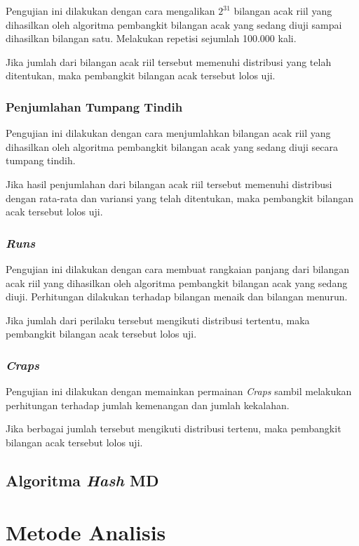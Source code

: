 \documentclass[conference]{IEEEtran}
\newcommand{\en}[1]
    {\foreignlanguage{english}{\textit{#1}}}
\begin{document}
Pengujian ini dilakukan dengan cara mengalikan $2^31$ bilangan acak riil yang dihasilkan oleh algoritma pembangkit bilangan acak yang sedang diuji sampai dihasilkan bilangan satu.
Melakukan repetisi sejumlah 100.000 kali.

Jika jumlah dari bilangan acak riil tersebut memenuhi distribusi yang telah ditentukan, maka pembangkit bilangan acak tersebut lolos uji.

\subsubsection{Penjumlahan Tumpang Tindih}

Pengujian ini dilakukan dengan cara menjumlahkan bilangan acak riil yang dihasilkan oleh algoritma pembangkit bilangan acak yang sedang diuji secara tumpang tindih.

Jika hasil penjumlahan dari bilangan acak riil tersebut memenuhi distribusi dengan rata-rata dan variansi yang telah ditentukan, maka pembangkit bilangan acak tersebut lolos uji.

\subsubsection{\en{Runs}}

Pengujian ini dilakukan dengan cara membuat rangkaian panjang dari bilangan acak riil yang dihasilkan oleh algoritma pembangkit bilangan acak yang sedang diuji.
Perhitungan dilakukan terhadap bilangan menaik dan bilangan menurun.

Jika jumlah dari perilaku tersebut mengikuti distribusi tertentu, maka pembangkit bilangan acak tersebut lolos uji.

\subsubsection{\en{Craps}}

Pengujian ini dilakukan dengan memainkan permainan \en{Craps} sambil melakukan perhitungan terhadap jumlah kemenangan dan jumlah kekalahan.

Jika berbagai jumlah tersebut mengikuti distribusi tertenu, maka pembangkit bilangan acak tersebut lolos uji.

\subsection{Algoritma \en{Hash} MD}

\section{Metode Analisis}
\end{document}
